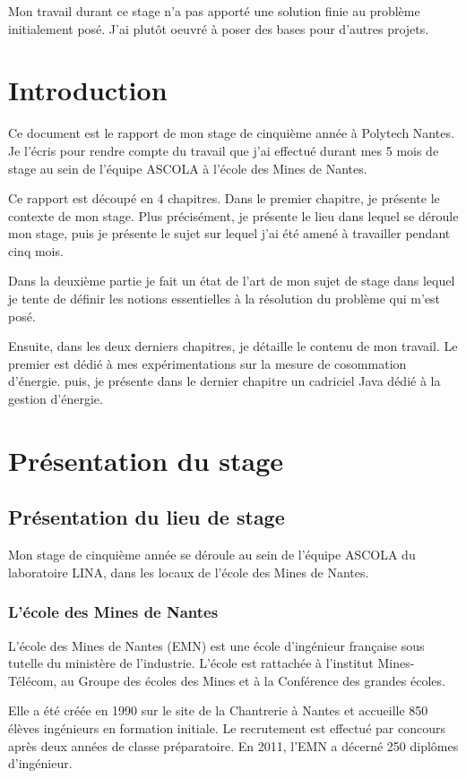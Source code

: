 \documentclass[a4paper, 11pt]{report}
\begin{document}
Mon travail durant ce stage n'a pas apporté une solution finie au problème initialement posé. J'ai plutôt oeuvré à poser des bases pour d'autres projets.
\newpage

\tableofcontents

\chapter{Introduction}
Ce document est le rapport de mon stage de cinquième année à Polytech Nantes. Je l'écris pour rendre compte du travail que j'ai effectué durant mes 5 mois de stage au sein de l'équipe ASCOLA à l'école des Mines de Nantes.

Ce rapport est découpé en 4 chapitres. Dans le premier chapitre, je présente le contexte de mon stage. Plus précisément, je présente le lieu dans lequel se déroule mon stage, puis je présente le sujet sur lequel j'ai été amené à travailler pendant cinq mois.

Dans la deuxième partie je fait un état de l'art de mon sujet de stage dans lequel je tente de définir les notions essentielles à la résolution du problème qui m'est posé.

Ensuite, dans les deux derniers chapitres, je détaille le contenu de mon travail. Le premier est dédié à mes expérimentations sur la mesure de cosommation d'énergie. puis, je présente dans le dernier chapitre un cadriciel Java dédié à la gestion d'énergie.

\chapter{Présentation du stage}
	\section{Présentation du lieu de stage}
Mon stage de cinquième année se déroule au sein de l’équipe ASCOLA du laboratoire LINA, dans les locaux de l’école des Mines de Nantes.
		\subsection{L'école des Mines de Nantes}
L’école des Mines de Nantes (EMN) est une école d’ingénieur française sous tutelle du ministère de l’industrie. L’école est rattachée à l’institut Mines-Télécom, au Groupe des écoles des Mines et à la Conférence des grandes écoles.

Elle a été créée en 1990 sur le site de la Chantrerie à Nantes et accueille 850 élèves ingénieurs en formation initiale. Le recrutement est effectué par concours après deux années de classe préparatoire. En 2011, l’EMN a décerné 250 diplômes d’ingénieur.
\end{document}
